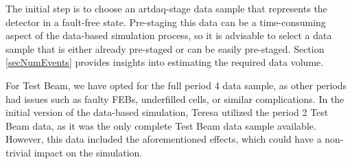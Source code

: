 \documentclass[12pt]{article}
\begin{document}
The initial step is to choose an artdaq-stage data sample that represents the detector in a fault-free state. Pre-staging this data can be a time-consuming aspect of the data-based simulation process, so it is advisable to select a data sample that is either already pre-staged or can be easily pre-staged. Section \ref{secNumEvents} provides insights into estimating the required data volume.

For Test Beam, we have opted for the full period 4 data sample, as other periods had issues such as faulty FEBs, underfilled cells, or similar complications. In the initial version of the data-based simulation, Teresa utilized the period 2 Test Beam data, as it was the only complete Test Beam data sample available. However, this data included the aforementioned effects, which could have a non-trivial impact on the simulation.




\end{document}
